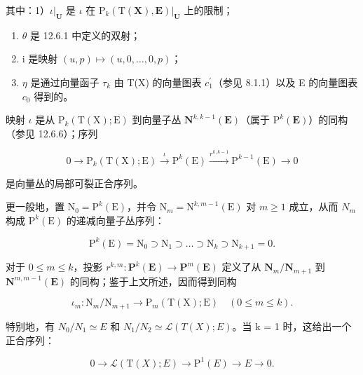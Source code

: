 其中：1）\(\iota|_{\mathbf{U}}\) 是 \(\iota\) 在 \(\mathrm{P}_{k}(\mathrm{T}(\mathbf{X}),\mathbf{E})|_{\mathbf{U}}\) 上的限制；

\begin{enumerate}
\def\labelenumi{\arabic{enumi})}
\setcounter{enumi}{1}
\item
  \(\theta\) 是 12.6.1 中定义的双射；
\item
  i 是映射 \((u, p) \mapsto (u, 0, \ldots, 0, p)\)；
\item
  \(\eta\) 是通过向量函子 \(\tau_{k}\) 由 T(X) 的向量图表 \(c_{1}^{\prime}\)（参见 8.1.1）以及 E 的向量图表 \(c_{0}\) 得到的。
\end{enumerate}

映射 \(\iota\) 是从 \(\mathrm{P}_{k}(\mathrm{T}(\mathrm{X});\mathrm{E})\) 到向量子丛 \(\mathbf{N}^{k,k - 1}(\mathbf{E})\)（属于 \(\mathrm{P}^k (\mathbf{E})\)）的同构（参见 12.6.6）；序列

\[
0 \rightarrow \mathrm{P}_{k}(\mathrm{T}(\mathrm{X});\mathrm{E}) \xrightarrow {\iota} \mathrm{P}^{k}(\mathrm{E}) \xrightarrow {r^{k,k-1}} \mathrm{P}^{k-1}(\mathrm{E}) \rightarrow 0
\]

是向量丛的局部可裂正合序列。

更一般地，置 \(\mathrm{N}_{0}=\mathrm{P}^{k}(\mathrm{E})\)，并令 \(\mathrm{N}_{m}=\mathrm{N}^{k,m-1}(\mathrm{E})\) 对 \(m\geqslant1\) 成立，从而 \(N_{m}\) 构成 \(\mathrm{P}^{k}(\mathrm{E})\) 的递减向量子丛序列：

\[
\mathrm{P} ^ {k} (\mathrm{E}) = \mathrm{N} _ {0} \supset \mathrm{N} _ {1} \supset \dots \supset \mathrm{N} _ {k} \supset \mathrm{N} _ {k + 1} = 0.
\]

对于 \(0 \leqslant m \leqslant k\)，投影 \(r^{k,m}: \mathbf{P}^{k}(\mathbf{E}) \to \mathbf{P}^{m}(\mathbf{E})\) 定义了从 \(\mathbf{N}_{m}/\mathbf{N}_{m+1}\) 到 \(\mathbf{N}^{m,m-1}(\mathbf{E})\) 的同构；鉴于上文所述，因而得到同构

\[
\iota_ {m} \colon \mathrm{N} _ {m} / \mathrm{N} _ {m + 1} \rightarrow \mathrm{P} _ {m} (\mathrm{T} (\mathrm{X}); \mathrm{E}) \quad (0 \leqslant m \leqslant k).
\]

特别地，有 \(N_{0}/N_{1} \simeq E\) 和 \(N_{1}/N_{2} \simeq \mathcal{L}(T(X); E)\)。当 k = 1 时，这给出一个正合序列：

\[
0 \rightarrow \mathscr {L} (\mathrm{T} (X); E) \rightarrow \mathrm{P} ^ {1} (E) \rightarrow E \rightarrow 0.
\]

